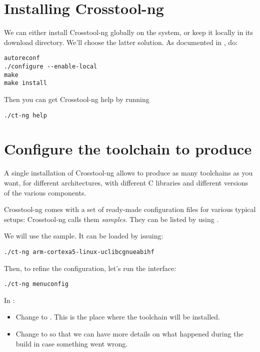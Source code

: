 \section{Installing Crosstool-ng}

We can either install Crosstool-ng globally on the system, or keep it
locally in its download directory. We'll choose the latter
solution. As documented in
, do:

\begin{verbatim}
autoreconf
./configure --enable-local
make
make install
\end{verbatim}

Then you can get Crosstool-ng help by running

\begin{verbatim}
./ct-ng help
\end{verbatim}

\section{Configure the toolchain to produce}

A single installation of Crosstool-ng allows to produce as many
toolchains as you want, for different architectures, with different C
libraries and different versions of the various components.

Crosstool-ng comes with a set of ready-made configuration files for
various typical setups: Crosstool-ng calls them {\em samples}. They can be
listed by using .

We will use the  sample. It
can be loaded by issuing:

\begin{verbatim}
./ct-ng arm-cortexa5-linux-uclibcgnueabihf
\end{verbatim}

Then, to refine the configuration, let's run the  interface:

\begin{verbatim}
./ct-ng menuconfig
\end{verbatim}

In :

\begin{itemize}
\item Change  to
  . This is the place where
  the toolchain will be installed.
\item Change  to  so that we can have more
  details on what happened during the build in case something went wrong.
\end{itemize}

